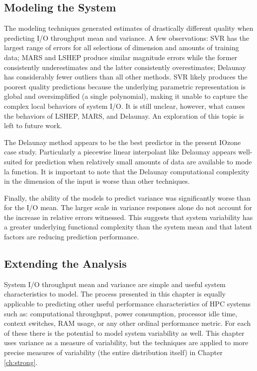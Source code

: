 \subsection{Modeling the System}

The modeling techniques generated estimates of drastically different
quality when predicting I/O throughput mean and variance. A few
observations: SVR has the largest range of errors for all selections
of dimension and amounts of training data; MARS and LSHEP produce
similar magnitude errors while the former consistently underestimates
and the latter consistently overestimates; Delaunay has considerably
fewer outliers than all other methods. SVR likely produces the poorest
quality predictions because the underlying parametric representation
is global and oversimplified (a single polynomial), making it unable
to capture the complex local behaviors of system I/O. It is still
unclear, however, what causes the behaviors of LSHEP, MARS, and
Delaunay. An exploration of this topic is left to future work.

The Delaunay method appears to be the best predictor in the present
IOzone case study. Particularly a piecewise linear interpolant like
Delaunay appears well-suited for prediction when relatively small
amounts of data are available to mode la function. It is important to
note that the Delaunay computational complexity in the dimension of
the input is worse than other techniques.

Finally, the ability of the models to predict variance was
significantly worse than for the I/O mean. The larger scale in
variance responses alone do not account for the increase in relative
errors witnessed. This suggests that system variability has a greater
underlying functional complexity than the system mean and that latent
factors are reducing prediction performance.

\subsection{Extending the Analysis}

System I/O throughput mean and variance are simple and useful system
characteristics to model. The process presented in this chapter is
equally applicable to predicting other useful performance
characteristics of HPC systems such as: computational throughput,
power consumption, processor idle time, context switches, RAM usage,
or any other ordinal performance metric. For each of these there is
the potential to model system variability as well. This chapter uses
variance as a measure of variability, but the techniques are applied
to more precise measures of variability (the entire distribution
itself) in Chapter \ref{ch:strong}.

